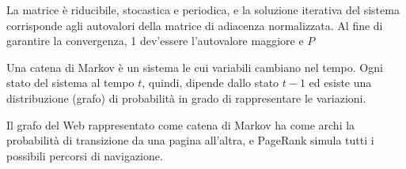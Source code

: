 La matrice è riducibile, stocastica e periodica, e la soluzione iterativa del sistema corrisponde agli autovalori della matrice di adiacenza normalizzata. Al fine di garantire la convergenza, 1 dev'essere l'autovalore maggiore e $P$ 

Una catena di Markov è un sistema le cui variabili cambiano nel tempo. Ogni stato del sistema al tempo $t$, quindi, dipende dallo stato $t - 1$ ed esiste una distribuzione (grafo) di probabilità in grado di rappresentare le variazioni.

Il grafo del Web rappresentato come catena di Markov ha come archi la probabilità di transizione da una pagina all'altra, e PageRank simula tutti i possibili percorsi di navigazione. 

